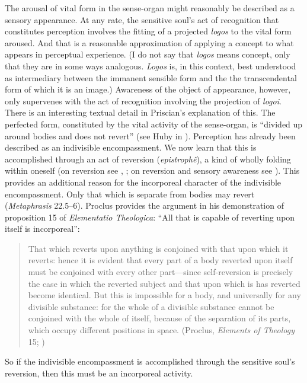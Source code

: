 \documentclass[12pt]{article}
\begin{document}
The arousal of vital form in the sense-organ might reasonably be described as a sensory appearance. At any rate, the sensitive soul's act of recognition that constitutes perception involves the fitting of a projected \emph{logos} to the vital form aroused. And that is a reasonable approximation of applying a concept to what appears in perceptual experience. (I do not say that \emph{logos} means concept, only that they are in some ways analogous. \emph{Logos} is, in this context, best understood as intermediary between the immanent sensible form and the the transcendental form of which it is an image.) Awareness of the object of appearance, however, only supervenes with the act of recognition involving the projection of \emph{logoi}. There is an interesting textual detail in Priscian's explanation of this. The perfected form, constituted by the vital activity of the sense-organ, is ``divided up around bodies and does not revert'' (see Huby in \citealt[51 n.31]{Sorabji:1997ly}). Perception has already been described as an indivisible encompassment. We now learn that this is accomplished through an act of reversion (\emph{epistrophê}), a kind of wholly folding within oneself (on reversion see \citealt[212--223]{Dodds:1963ul}, \citealt[126-30]{Lloyd:1990dp}; on reversion and sensory awareness see \citealt{Lautner:1994cs}). This provides an additional reason for the incorporeal character of the indivisible encompassment. Only that which is separate from bodies may revert (\emph{Metaphrasis} 22.5--6). Proclus provides the argument in his demonstration of proposition 15 of \emph{Elementatio Theologica}: ``All that is capable of reverting upon itself is incorporeal'':
\begin{quote}
	That which reverts upon anything is conjoined with that upon which it reverts: hence it is evident that every part of a body reverted upon itself must be conjoined with every other part---since self-reversion is precisely the case in which the reverted subject and that upon which is has reverted become identical. But this is impossible for a body, and universally for any divisible substance: for the whole of a divisible substance cannot be conjoined with the whole of itself, because of the separation of its parts, which occupy different positions in space. (Proclus, \emph{Elements of Theology} 15; \citealt[18--19]{Dodds:1963ul})
\end{quote}
So if the indivisible encompassment is accomplished through the sensitive soul's reversion, then this must be an incorporeal activity. 
\end{document}
